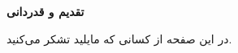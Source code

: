 \thispagestyle{empty}

\vspace*{1cm}

\centerline{\Large\textbf{تقدیم و قدردانی}}
\vskip 1.8cm

{در این صفحه از کسانی که مایلید تشکر می‌کنید.}




